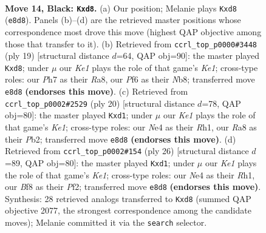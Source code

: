 \documentclass[11pt]{article}
\begin{document}
\clearpage

\begin{figure}[p]\centering
\begin{subfigure}{0.46\textwidth}\centering
\resizebox{\linewidth}{!}{%
\newchessgame
\chessboard[
  setfen={r2Qkb1r/pp4pp/5p2/4pb1P/P1P1n1P1/8/1P3P2/R1B1KB1R b KQkq - 0 14},
  showmover=false,
  pgfstyle=straightmove, color=movearrow, markmove={e8-d8}
]}
\caption{}
\end{subfigure}\hfill
\begin{subfigure}{0.46\textwidth}\centering
\resizebox{\linewidth}{!}{%
\newchessgame
\chessboard[
  setfen={rnbQkb1r/1p3ppp/p3p3/8/6P1/2n4P/PPP1NP2/R1B1KB1R b KQkq - 0 10},
  showmover=false,
  pgfstyle=straightmove, color=movearrow, markmove={e8-d8}
]}
\caption{}
\end{subfigure}
\\[4pt]
\begin{subfigure}{0.46\textwidth}\centering
\resizebox{\linewidth}{!}{%
\newchessgame
\chessboard[
  setfen={r1b1k2r/p4ppp/2p1pn2/8/1bB2B2/2N1P3/PP3PPP/R2qK2R w KQkq - 0 11},
  showmover=false,
  pgfstyle=straightmove, color=movearrow, markmove={e1-d1}
]}
\caption{}
\end{subfigure}\hfill
\begin{subfigure}{0.46\textwidth}\centering
\resizebox{\linewidth}{!}{%
\newchessgame
\chessboard[
  setfen={r1b2rk1/pp3p1p/1n2P1p1/2p5/4P3/1BP2N2/P4PPP/R2qK2R w KQ - 0 14},
  showmover=false,
  pgfstyle=straightmove, color=movearrow, markmove={e1-d1}
]}
\caption{}
\end{subfigure}
\caption{\textbf{Move 14, Black: \texttt{Kxd8}.} (a) Our position; Melanie plays \texttt{Kxd8} (\texttt{e8d8}). Panels (b)--(d) are the retrieved master positions whose correspondence most drove this move (highest QAP objective among those that transfer to it). (b) Retrieved from \texttt{ccrl\_top\_p0000\#3448} (ply 19) [structural distance $d$=64, QAP obj=90]: the master played \texttt{Kxd8}; under $\mu$ our \emph{Ke1} plays the role of that game's \emph{Ke1}; cross-type roles: our \emph{P}h7 as their \emph{R}a8, our \emph{P}f6 as their \emph{N}b8; transferred move \texttt{e8d8} \textbf{(endorses this move)}. (c) Retrieved from \texttt{ccrl\_top\_p0002\#2529} (ply 20) [structural distance $d$=78, QAP obj=80]: the master played \texttt{Kxd1}; under $\mu$ our \emph{Ke1} plays the role of that game's \emph{Ke1}; cross-type roles: our \emph{N}e4 as their \emph{R}h1, our \emph{R}a8 as their \emph{P}b2; transferred move \texttt{e8d8} \textbf{(endorses this move)}. (d) Retrieved from \texttt{ccrl\_top\_p0002\#154} (ply 26) [structural distance $d$=89, QAP obj=80]: the master played \texttt{Kxd1}; under $\mu$ our \emph{Ke1} plays the role of that game's \emph{Ke1}; cross-type roles: our \emph{N}e4 as their \emph{R}h1, our \emph{B}f8 as their \emph{P}f2; transferred move \texttt{e8d8} \textbf{(endorses this move)}. Synthesis: 28 retrieved analogs transferred to \texttt{Kxd8} (summed QAP objective 2077, the strongest correspondence among the candidate moves); Melanie committed it via the \texttt{search} selector.}
\label{fig:thought-m27}
\end{figure}
\end{document}

